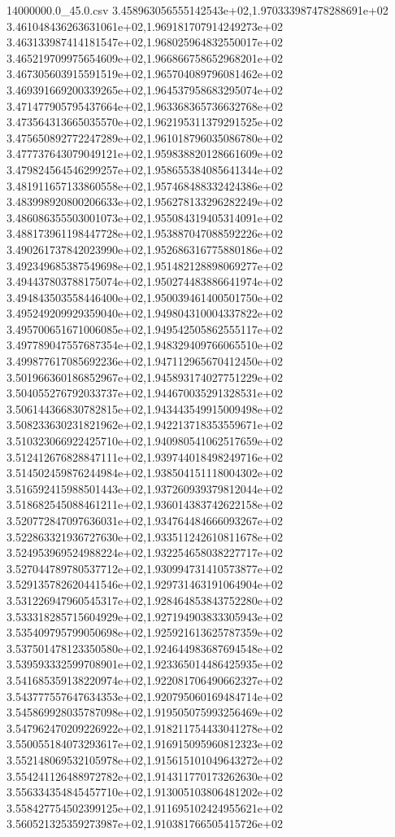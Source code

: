 \begin{filecontents*}{14000000.0_45.0.csv}
3.458963056555142543e+02,1.970333987478288691e+02
3.461048436263631061e+02,1.969181707914249273e+02
3.463133987414181547e+02,1.968025964832550017e+02
3.465219709975654609e+02,1.966866758652968201e+02
3.467305603915591519e+02,1.965704089796081462e+02
3.469391669200339265e+02,1.964537958683295074e+02
3.471477905795437664e+02,1.963368365736632768e+02
3.473564313665035570e+02,1.962195311379291525e+02
3.475650892772247289e+02,1.961018796035086780e+02
3.477737643079049121e+02,1.959838820128661609e+02
3.479824564546299257e+02,1.958655384085641344e+02
3.481911657133860558e+02,1.957468488332424386e+02
3.483998920800206633e+02,1.956278133296282249e+02
3.486086355503001073e+02,1.955084319405314091e+02
3.488173961198447728e+02,1.953887047088592226e+02
3.490261737842023990e+02,1.952686316775880186e+02
3.492349685387549698e+02,1.951482128898069277e+02
3.494437803788175074e+02,1.950274483886641974e+02
3.494843503558446400e+02,1.950039461400501750e+02
3.495249209929359040e+02,1.949804310004337822e+02
3.495700651671006085e+02,1.949542505862555117e+02
3.497789047557687354e+02,1.948329409766065510e+02
3.499877617085692236e+02,1.947112965670412450e+02
3.501966360186852967e+02,1.945893174027751229e+02
3.504055276792033737e+02,1.944670035291328531e+02
3.506144366830782815e+02,1.943443549915009498e+02
3.508233630231821962e+02,1.942213718353559671e+02
3.510323066922425710e+02,1.940980541062517659e+02
3.512412676828847111e+02,1.939744018498249716e+02
3.514502459876244984e+02,1.938504151118004302e+02
3.516592415988501443e+02,1.937260939379812044e+02
3.518682545088461211e+02,1.936014383742622158e+02
3.520772847097636031e+02,1.934764484666093267e+02
3.522863321936727630e+02,1.933511242610811678e+02
3.524953969524988224e+02,1.932254658038227717e+02
3.527044789780537712e+02,1.930994731410573877e+02
3.529135782620441546e+02,1.929731463191064904e+02
3.531226947960545317e+02,1.928464853843752280e+02
3.533318285715604929e+02,1.927194903833305943e+02
3.535409795799050698e+02,1.925921613625787359e+02
3.537501478123350580e+02,1.924644983687694548e+02
3.539593332599708901e+02,1.923365014486425935e+02
3.541685359138220974e+02,1.922081706490662327e+02
3.543777557647634353e+02,1.920795060169484714e+02
3.545869928035787098e+02,1.919505075993256469e+02
3.547962470209226922e+02,1.918211754433041278e+02
3.550055184073293617e+02,1.916915095960812323e+02
3.552148069532105978e+02,1.915615101049643272e+02
3.554241126488972782e+02,1.914311770173262630e+02
3.556334354845457710e+02,1.913005103806481202e+02
3.558427754502399125e+02,1.911695102424955621e+02
3.560521325359273987e+02,1.910381766505415726e+02

\end{filecontents*}
